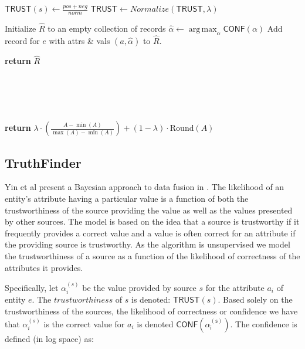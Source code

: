 \documentclass{acm_proc_article-sp}
\DeclareMathOperator*{\argmax}{arg\,max}
\begin{document}
\begin{algorithm}
\begin{algorithmic}[1]
		        \State $\mathsf{TRUST}(s) \gets \frac{pos + neg}{norm}$ 
	\EndFor
         \State $\mathsf{TRUST} \gets Normalize(\mathsf{TRUST},\lambda)$


	\State Initialize $\hat{R}$ to an empty collection of records
		\State $\hat{\alpha} \leftarrow \argmax_{\alpha} \mathsf{CONF}(\alpha)$
		\EndFor
		\State Add record for $e$ with attrs \& vals $(a, \hat{\alpha})$ to $\hat{R}$.
	\EndFor

\EndWhile
\State \textbf{return} $\hat{R}$
\EndFunction

 \\

 \\
 \\
 \\

\State \textbf{return} $\lambda \cdot \left (\frac{A - \min(A)}{\max(A)-\min(A)} \right) + (1-\lambda) \cdot ${\sc Round}$( A )$

\EndFunction
\end{algorithmic}
\end{algorithm}  


\subsection{TruthFinder}

Yin et al present a Bayesian approach to data fusion in \cite{yin:truth}.  The likelihood of an entity's attribute having a particular value is a function of both the trustworthiness of the source providing the value as well as the values presented by other sources. The model is based on the idea that a source is trustworthy if it frequently provides a correct value and a value is often correct for an attribute if the providing source is trustworthy. As the algorithm is unsupervised we model the trustworthiness of a source as a function of the likelihood of correctness of the attributes it provides. 

Specifically, let $\alpha_i^{(s)}$ be the value provided by source $s$ for the attribute $a_i$ of entity $e$. The $trustworthiness$ of $s$ is denoted: $\mathsf{TRUST}(s)$. Based solely on the trustworthiness of the sources, the likelihood of correctness or confidence we have that $\alpha_i^{(s)}$ is the correct value for $a_i$ is denoted $\mathsf{CONF(\alpha_i^{(s)})}$.  The confidence is defined (in log space) as:
\end{document}
